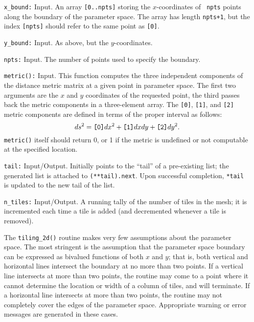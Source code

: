 \begin{description}
\item{\tt x\_bound:}
  Input.  An array {\tt [0..npts]} storing the $x$-coordinates of {\tt
  npts} points along the boundary of the parameter space.  The array
  has length {\tt npts+1}, but the index {\tt [npts]} should refer to
  the same point as {\tt [0]}.

\item{\tt y\_bound:}
  Input.  As above, but the $y$-coordinates.

\item{\tt npts:}
  Input.  The number of points used to specify the boundary.

\item{\tt metric():}
  Input.  This function computes the three independent components of
  the distance metric matrix at a given point in parameter space.  The
  first two arguments are the $x$ and $y$ coordinates of the requested
  point, the third passes back the metric components in a
  three-element array.  The {\tt [0]}, {\tt [1]}, and {\tt [2]} metric
  components are defined in terms of the proper interval as follows:
  $$
    ds^2 = \hbox{\tt [0]}dx^2 + \hbox{\tt [1]}dxdy
         + \hbox{\tt [2]}dy^2 .
  $$
  {\tt metric()} itself should return 0, or 1 if the metric is
  undefined or not computable at the specified location.

\item{\tt tail:}
  Input/Output.  Initially points to the ``tail'' of a pre-existing
  list; the generated list is attached to {\tt (**tail).next}.  Upon
  successful completion, {\tt **tail} is updated to the new tail of
  the list.

\item{\tt n\_tiles:}
  Input/Output.  A running tally of the number of tiles in the mesh;
  it is incremented each time a tile is added (and decremented
  whenever a tile is removed).

\end{description}

The {\tt tiling\_2d()} routine makes very few assumptions about the
parameter space.  The most stringent is the assumption that the
parameter space boundary can be expressed as bivalued functions of
both $x$ and $y$; that is, both vertical and horizontal lines
intersect the boundary at no more than two points.  If a vertical line
intersects at more than two points, the routine may come to a point
where it cannot determine the location or width of a column of tiles,
and will terminate.  If a horizontal line intersects at more than two
points, the routine may not completely cover the edges of the
parameter space.  Appropriate warning or error messages are generated
in these cases.

